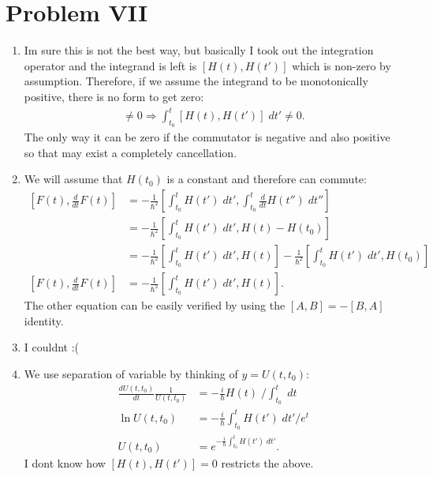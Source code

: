 \documentclass[letterpaper,11pt,twoside]{article}
\begin{document}
\section*{Problem VII}
\begin{enumerate}[itemsep=0pt,topsep=0pt,label=(\alph*)]
  \item Im sure this is not the best way, but basically I took out the integration operator and the integrand is left is $[H(t),H(t')]$ which is non-zero by 
  assumption. Therefore, if we assume the integrand to be monotonically positive, there is no form to get zero:
  \begin{align*}
    [H(t),H(t')]\neq0\Longrightarrow \int_{t_0}^t[H(t),H(t')]\;dt'\neq0.
  \end{align*}
  The only way it can be zero if the commutator is negative and also positive so that may exist a completely cancellation.
  \item We will assume that $H(t_0)$ is a constant and therefore can commute:
  \begin{align*}
    \left[F(t),\frac{d}{dt}F(t)\right]&=-\frac{1}{\hbar^2}\left[\int_{t_0}^tH(t')\;dt',\int_{t_0}^t\frac{d}{dt}H(t'')\;dt''\right]\\
    &=-\frac{1}{\hbar^2}\left[\int_{t_0}^tH(t')\;dt',H(t)-H(t_0)\right]\\
    &=-\frac{1}{\hbar^2}\left[\int_{t_0}^tH(t')\;dt',H(t)\right]-\frac{1}{\hbar^2}\left[\int_{t_0}^tH(t')\;dt',H(t_0)\right]\\
    \left[F(t),\frac{d}{dt}F(t)\right]&=-\frac{1}{\hbar^2}\left[\int_{t_0}^tH(t')\;dt',H(t)\right].
  \end{align*}
  The other equation can be easily verified by using the $[A,B]=-[B,A]$ identity.
  \item I couldnt :( 
  \item We use separation of variable by thinking of $y=U(t,t_0)$:
  \begin{align*}
    \frac{dU(t,t_0)}{dt}\frac{1}{U(t,t_0)}&=-\frac{i}{\hbar}H(t)\;\biggr/\int_{t_0}^t\;dt\\
    \ln U(t,t_0)&=-\frac{i}{\hbar}\int_{t_0}^tH(t')\;dt'\bigr/e^t\\
    U(t,t_0)&=e^{-\frac{i}{\hbar}\int_{t_0}^tH(t')\;dt'}.
  \end{align*}
  I dont know how $[H(t),H(t')]=0$ restricts the above.
\end{enumerate}

%
\end{document}
